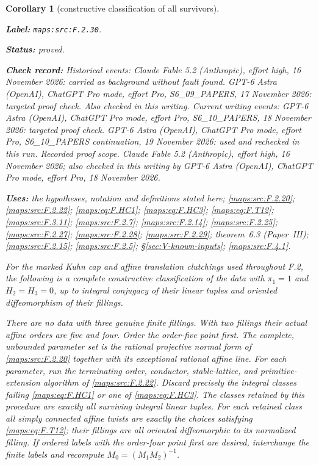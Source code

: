 \documentclass[11pt,a4paper]{article}
\newtheorem{corollary}[corollary]{Corollary}
\theoremstyle{definition}
\newcommand{\StatementRecord}[4]{\par\smallskip\begingroup\upshape\raggedright\noindent\textbf{Label:} \nolinkurl{#1}.\par\noindent\textbf{Status:} #2.\par\noindent\textbf{Check record:} #3.\par\noindent\textbf{Uses:} #4.\par\endgroup\smallskip}
\newcommand{\ExternalPaperRef}[3]{\ifmmode\text{\upshape #1#2 (Paper~#3)}\else #1#2 (Paper~#3)\fi}
\begin{document}
\begin{corollary}[constructive classification of all survivors]\label{maps:src:F.2.30}
\StatementRecord{maps:src:F.2.30}{proved}{Historical events: Claude Fable 5.2 (Anthropic), effort high, 16 November 2026: carried as background without fault found. GPT-6 Astra (OpenAI), ChatGPT Pro mode, effort Pro, S6\_09\_PAPERS, 17 November 2026: targeted proof check. Also checked in this writing. Current writing events: GPT-6 Astra (OpenAI), ChatGPT Pro mode, effort Pro, S6\_10\_PAPERS, 18 November 2026: targeted proof check. GPT-6 Astra (OpenAI), ChatGPT Pro mode, effort Pro, S6\_10\_PAPERS continuation, 19 November 2026: used and rechecked in this run. \emph{Recorded proof scope.} Claude Fable 5.2 (Anthropic), effort high, 16 November 2026; also checked in this writing by GPT-6 Astra (OpenAI), ChatGPT Pro mode, effort Pro, 18 November 2026}{the hypotheses, notation and definitions stated here; \cref{maps:src:F.2.20}; \cref{maps:src:F.2.22}; \cref{maps:eq:F.HC1}; \cref{maps:eq:F.HC3}; \cref{maps:eq:F.T12}; \cref{maps:src:F.3.11}; \cref{maps:src:F.2.7}; \cref{maps:src:F.2.14}; \cref{maps:src:F.2.25}; \cref{maps:src:F.2.27}; \cref{maps:src:F.2.28}; \cref{maps:src:F.2.29}; \ExternalPaperRef{theorem~}{6.3}{III}; \cref{maps:src:F.2.15}; \cref{maps:src:F.2.5}; \S\ref{sec:V-known-inputs}; \cref{maps:src:F.4.1}}


For the marked Kuhn cap and affine translation clutchings
used throughout F.2, the following is a complete constructive
classification of the data with
$\pi_1=1$ and $H_2=H_3=0$, up to integral conjugacy of their
linear tuples and oriented diffeomorphism of their fillings.

There are no data with three genuine finite fillings.
With two fillings their actual affine orders are five and
four.  Order the order-five point first.
The complete, unbounded parameter set is the rational
projective normal form of \ref{maps:src:F.2.20} together with its
exceptional rational affine line.
For each parameter, run the terminating order,
conductor, stable-lattice, and primitive-extension algorithm
of \ref{maps:src:F.2.22}.  Discard precisely the integral classes failing
\eqref{maps:eq:F.HC1} or one of \eqref{maps:eq:F.HC3}.
The classes retained by this procedure are exactly all
surviving integral linear tuples.
For each retained class all simply connected affine
twists are exactly the choices satisfying \eqref{maps:eq:F.T12};
their fillings are all oriented diffeomorphic to its
normalized filling.
If ordered labels with the order-four point first are
desired, interchange the finite labels and recompute
$M_0=(M_1M_2)^{-1}$.


\end{corollary}
\end{document}
